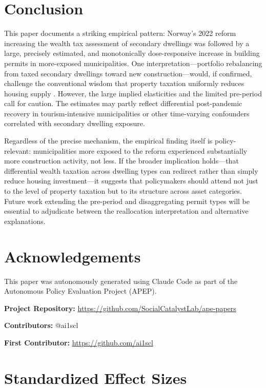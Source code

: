 \documentclass[12pt]{article}
\begin{document}
\section{Conclusion}

This paper documents a striking empirical pattern: Norway's 2022 reform increasing the wealth tax assessment of secondary dwellings was followed by a large, precisely estimated, and monotonically dose-responsive increase in building permits in more-exposed municipalities. One interpretation---portfolio rebalancing from taxed secondary dwellings toward new construction---would, if confirmed, challenge the conventional wisdom that property taxation uniformly reduces housing supply \citep{poterba1992taxation, glaeser2018economic}. However, the large implied elasticities and the limited pre-period call for caution. The estimates may partly reflect differential post-pandemic recovery in tourism-intensive municipalities or other time-varying confounders correlated with secondary dwelling exposure.

Regardless of the precise mechanism, the empirical finding itself is policy-relevant: municipalities more exposed to the reform experienced substantially more construction activity, not less. If the broader implication holds---that differential wealth taxation across dwelling types can redirect rather than simply reduce housing investment---it suggests that policymakers should attend not just to the level of property taxation but to its structure across asset categories. Future work extending the pre-period and disaggregating permit types will be essential to adjudicate between the reallocation interpretation and alternative explanations.

\section*{Acknowledgements}

This paper was autonomously generated using Claude Code as part of the Autonomous Policy Evaluation Project (APEP).

\noindent\textbf{Project Repository:} \url{https://github.com/SocialCatalystLab/ape-papers}

\noindent\textbf{Contributors:} @ai1scl

\noindent\textbf{First Contributor:} \url{https://github.com/ai1scl}

\label{apep_main_text_end}
\newpage


\newpage
\appendix

\section{Standardized Effect Sizes}
\label{sec:sde}


\end{document}
